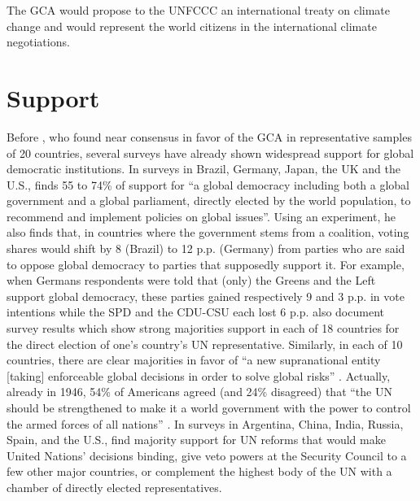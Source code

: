 \documentclass[12pt,english]{article}
\begin{document}
The GCA would propose to the UNFCCC an international treaty on climate change and would represent the world citizens in the international climate negotiations. %

\section{Support}\label{sec:support}

Before \citet{fabre_international_2023}, who found near consensus in favor of the GCA in representative samples of 20 countries, several surveys have already shown widespread support for global democratic institutions. In surveys in Brazil, Germany, Japan, the UK and the U.S., \citet{ghassim_who_2020} finds 55 to 74\% of support for ``a global democracy including both a global government and a global parliament, directly elected by the world population, to recommend and implement policies on global issues''. %
Using an experiment, he also finds that, in countries where the government stems from a coalition, voting shares would shift by 8 (Brazil) to 12 p.p. (Germany) from parties who are said to oppose global democracy to parties that supposedly support it. For example, when Germans respondents were told that (only) the Greens and the Left support global democracy, these parties gained respectively 9 and 3 p.p. in vote intentions while the SPD and the CDU-CSU each lost 6 p.p.  
\citet{ghassim_who_2020} also document survey results which show strong majorities support in each of 18 countries for the direct election of one's country's UN representative. %
Similarly, in each of 10 countries, there are clear majorities in favor of ``a new supranational entity [taking] enforceable global decisions in order to solve global risks'' \citep{global_challenges_foundation_attitudes_2018}. Actually, already in 1946, 54\% of Americans agreed (and 24\% disagreed) that ``the UN should be strengthened to make it a world government with the power to control the armed forces of all nations'' \citep{gallup_seventy_1946}. 
In surveys in Argentina, China, India, Russia, Spain, and the U.S., \citet{ghassim_public_2022} find majority support for UN reforms that would make United Nations' decisions binding, give veto powers at the Security Council to a few other major countries, or complement the highest body of the UN with a chamber of directly elected representatives. 
\end{document}
